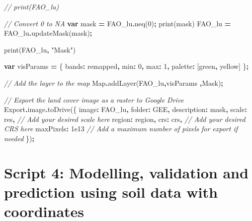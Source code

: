 \documentclass[
  10pt,
  b5paper,
  oneside]{book}
\newenvironment{Shaded}{\begin{snugshade}}{\end{snugshade}}
\newcommand{\AttributeTok}[1]{\textcolor[rgb]{0.77,0.63,0.00}{#1}}
\newcommand{\BuiltInTok}[1]{#1}
\newcommand{\CommentTok}[1]{\textcolor[rgb]{0.56,0.35,0.01}{\textit{#1}}}
\newcommand{\DataTypeTok}[1]{\textcolor[rgb]{0.13,0.29,0.53}{#1}}
\newcommand{\DecValTok}[1]{\textcolor[rgb]{0.00,0.00,0.81}{#1}}
\newcommand{\FloatTok}[1]{\textcolor[rgb]{0.00,0.00,0.81}{#1}}
\newcommand{\FunctionTok}[1]{\textcolor[rgb]{0.00,0.00,0.00}{#1}}
\newcommand{\KeywordTok}[1]{\textcolor[rgb]{0.13,0.29,0.53}{\textbf{#1}}}
\newcommand{\NormalTok}[1]{#1}
\newcommand{\OperatorTok}[1]{\textcolor[rgb]{0.81,0.36,0.00}{\textbf{#1}}}
\newcommand{\StringTok}[1]{\textcolor[rgb]{0.31,0.60,0.02}{#1}}
\begin{document}
\begin{Shaded}
\begin{Highlighting}[]
\CommentTok{// print(FAO\_lu)}

\CommentTok{// Convert 0 to NA}
\KeywordTok{var}\NormalTok{ mask }\OperatorTok{=}\NormalTok{ FAO\_lu}\OperatorTok{.}\FunctionTok{neq}\NormalTok{(}\DecValTok{0}\NormalTok{)}\OperatorTok{;}
\FunctionTok{print}\NormalTok{(mask)}
\NormalTok{FAO\_lu }\OperatorTok{=}\NormalTok{ FAO\_lu}\OperatorTok{.}\FunctionTok{updateMask}\NormalTok{(mask)}\OperatorTok{;}

\FunctionTok{print}\NormalTok{(FAO\_lu}\OperatorTok{,} \StringTok{"Mask"}\NormalTok{)}

\KeywordTok{var}\NormalTok{ visParams }\OperatorTok{=}\NormalTok{ \{}
  \DataTypeTok{bands}\OperatorTok{:} \StringTok{\textquotesingle{}remapped\textquotesingle{}}\OperatorTok{,}
  \DataTypeTok{min}\OperatorTok{:} \DecValTok{0}\OperatorTok{,}
  \DataTypeTok{max}\OperatorTok{:} \DecValTok{1}\OperatorTok{,}
  \DataTypeTok{palette}\OperatorTok{:}\NormalTok{ [}\StringTok{\textquotesingle{}green\textquotesingle{}}\OperatorTok{,} \StringTok{\textquotesingle{}yellow\textquotesingle{}}\NormalTok{]}
\NormalTok{\}}\OperatorTok{;}

\CommentTok{// Add the layer to the map}
\BuiltInTok{Map}\OperatorTok{.}\FunctionTok{addLayer}\NormalTok{(FAO\_lu}\OperatorTok{,}\NormalTok{visParams }\OperatorTok{,}\StringTok{\textquotesingle{}Mask\textquotesingle{}}\NormalTok{)}\OperatorTok{;}

\CommentTok{// Export the land cover image as a raster to Google Drive}
\NormalTok{Export}\OperatorTok{.}\AttributeTok{image}\OperatorTok{.}\FunctionTok{toDrive}\NormalTok{(\{}
  \DataTypeTok{image}\OperatorTok{:}\NormalTok{ FAO\_lu}\OperatorTok{,}
  \DataTypeTok{folder}\OperatorTok{:} \StringTok{\textquotesingle{}GEE\textquotesingle{}}\OperatorTok{,}
  \DataTypeTok{description}\OperatorTok{:} \StringTok{\textquotesingle{}mask\textquotesingle{}}\OperatorTok{,}
  \DataTypeTok{scale}\OperatorTok{:}\NormalTok{ res}\OperatorTok{,} \CommentTok{// Add your desired scale here}
  \DataTypeTok{region}\OperatorTok{:}\NormalTok{ region}\OperatorTok{,}
  \DataTypeTok{crs}\OperatorTok{:}\NormalTok{ crs}\OperatorTok{,} \CommentTok{// Add your desired CRS here}
  \DataTypeTok{maxPixels}\OperatorTok{:} \FloatTok{1e13} \CommentTok{// Add a maximum number of pixels for export if needed}
\NormalTok{\})}\OperatorTok{;}
\end{Highlighting}
\end{Shaded}

\hypertarget{script-4-modelling-validation-and-prediction-using-soil-data-with-coordinates}{%
\section*{Script 4: Modelling, validation and prediction using soil data with coordinates}\label{script-4-modelling-validation-and-prediction-using-soil-data-with-coordinates}}
\end{document}
